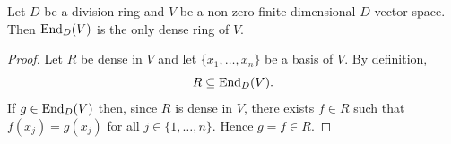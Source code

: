 %
%

\begin{proposition}
	\label{pro:unique_dense}
	Let $D$ be a division ring and 
    $V$ be a non-zero finite-dimensional $D$-vector space.  
	Then $\operatorname{End}_D(V)$ is the only dense ring of $V$.
\end{proposition}

\begin{proof}
	Let $R$ be dense in $V$ and let $\{x_1,\dots,x_n\}$ be a basis of $V$. By definition,
	\[
    R\subseteq\operatorname{End}_D(V).
    \]
    If $g\in\operatorname{End}_D(V)$ then, since $R$ is dense in $V$, there
	exists $f\in R$ such that $f(x_j)=g(x_j)$ for all 
	$j\in\{1,\dots,n\}$. Hence $g=f\in R$.
\end{proof}



